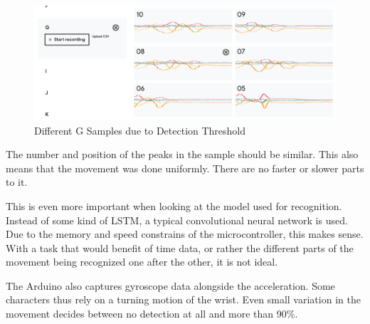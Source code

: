 \documentclass[a4paper,titlepage]{article}
\begin{document}
\begin{figure}[H]
    \includegraphics[width=\textwidth]{different_samples_not_good.png}
    \caption{Different G Samples due to Detection Threshold}
\end{figure}

The number and position of the peaks in the sample should be similar.
This also means that the movement was done uniformly.
There are no faster or slower parts to it.

This is even more important when looking at the model used for recognition.
Instead of some kind of LSTM, a typical convolutional neural network is used.
Due to the memory and speed constrains of the microcontroller, this makes sense.
With a task that would benefit of time data, or rather the different parts of the movement being recognized one after the other, it is not ideal.

The Arduino also captures gyroscope data alongside the acceleration.
Some characters thus rely on a turning motion of the wrist.
Even small variation in the movement decides between no detection at all and more than 90\%.
\end{document}
